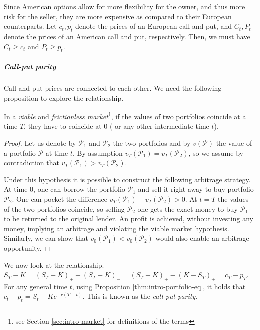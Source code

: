 Since American options allow for more flexibility for the owner, and thus more risk for the seller, they are more expensive as compared to their European counterparts. Let $ c_t, p_t $ denote the prices of an European call and put, and $ C_t, P_t $ denote the prices of an American call and put, respectively. Then, we must have $ C_t \ge c_t $ and $ P_t \ge p_t $.


\subparagraph{Call-put parity}  Call and put prices are connected to each other. We need the following proposition to explore the relationship.

\begin{prp}
	\label{thm:intro-portfolio-eq}
	In a \emph{viable} and \emph{frictionless market}\footnote{see Section \ref{sec:intro-market} for definitions of the terms}, if the values of two portfolios coincide at a time $ T $, they have to coincide at $ 0 $ ( or any other intermediate time $ t $).
\end{prp}

\begin{proof}
	Let us denote by $ \mathcal{P}_1 $ and $ \mathcal{P}_2 $ the two portfolios and by $ v(\mathcal{P}) $ the value of a portfolio $ \mathcal{P} $ at time $ t $. By assumption $ v_T (\mathcal{P}_1) = v_T (\mathcal{P}_2) $, so we assume by contradiction that $ v_T (\mathcal{P}_1) > v_T (\mathcal{P}_2) $.
	
	Under this hypothesis it is possible to construct the following arbitrage strategy. At time 0, one can borrow the portfolio $ \mathcal{P}_1 $ and sell it right away to buy portfolio $ \mathcal{P}_2 $. One can pocket the difference $ v_T (\mathcal{P}_1) - v_T (\mathcal{P}_2) > 0 $. At $ t = T $ the values of the two portfolios coincide, so selling $ \mathcal{P}_2 $ one gets the exact money to buy $ \mathcal{P}_1 $ to be returned to the original lender. An profit is achieved, without investing any money, implying an arbitrage and violating the viable market hypothesis. Similarly, we can show that $ v_0 (\mathcal{P}_1) < v_0 (\mathcal{P}_2) $ would also enable an arbitrage opportunity.
\end{proof}

We now look at the relationship. $ S_T - K = (S_T - K)_+ + (S_T - K)_- = (S_T - K)_+ - (K - S_T)_+ = c_T - p_T $. For any general time $ t $, using Proposition \ref{thm:intro-portfolio-eq}, it holds that $ c_t - p_t = S_t - K e^{- r (T-t) } $. This is known as the \emph{call-put parity}.



